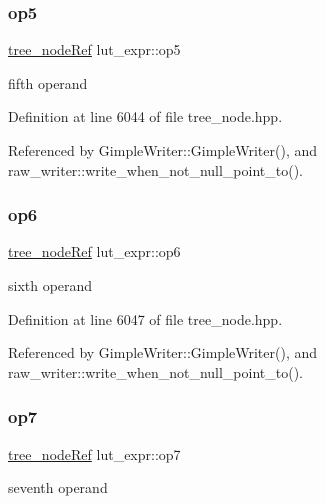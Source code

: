 \subsubsection{\texorpdfstring{op5}{op5}}
{\footnotesize\ttfamily \hyperlink{tree__node_8hpp_a6ee377554d1c4871ad66a337eaa67fd5}{tree\+\_\+node\+Ref} lut\+\_\+expr\+::op5}



fifth operand 



Definition at line 6044 of file tree\+\_\+node.\+hpp.



Referenced by Gimple\+Writer\+::\+Gimple\+Writer(), and raw\+\_\+writer\+::write\+\_\+when\+\_\+not\+\_\+null\+\_\+point\+\_\+to().

\mbox{\label{structlut__expr_a74384517b4a0f823d0374fc8b394af63}} 
\subsubsection{\texorpdfstring{op6}{op6}}
{\footnotesize\ttfamily \hyperlink{tree__node_8hpp_a6ee377554d1c4871ad66a337eaa67fd5}{tree\+\_\+node\+Ref} lut\+\_\+expr\+::op6}



sixth operand 



Definition at line 6047 of file tree\+\_\+node.\+hpp.



Referenced by Gimple\+Writer\+::\+Gimple\+Writer(), and raw\+\_\+writer\+::write\+\_\+when\+\_\+not\+\_\+null\+\_\+point\+\_\+to().

\mbox{\label{structlut__expr_a0ae07e374e2ec8619f31ead11a44d0a9}} 
\subsubsection{\texorpdfstring{op7}{op7}}
{\footnotesize\ttfamily \hyperlink{tree__node_8hpp_a6ee377554d1c4871ad66a337eaa67fd5}{tree\+\_\+node\+Ref} lut\+\_\+expr\+::op7}



seventh operand 



